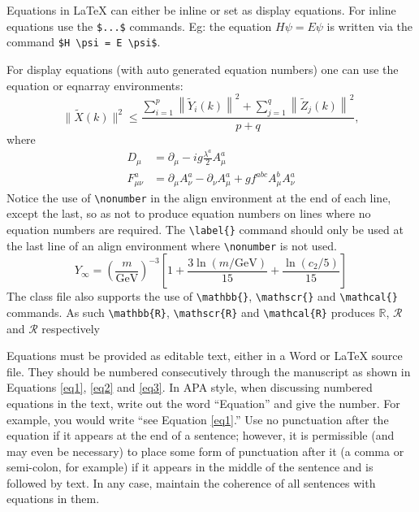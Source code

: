 \documentclass[12pt,a4paper]{article}
\begin{document}
Equations in \LaTeX{} can either be inline or set as display equations. For
inline equations use the \verb+$...$+ commands. Eg: the equation
$H\psi = E \psi$ is written via the command \verb+$H \psi = E \psi$+.

For display equations (with auto generated equation numbers)
one can use the equation or eqnarray environments:
\begin{equation}
\|\tilde{X}(k)\|^2 \leq\frac{\sum\limits_{i=1}^{p}\left\|\tilde{Y}_i(k)\right\|^2+\sum\limits_{j=1}^{q}\left\|\tilde{Z}_j(k)\right\|^2 }{p+q},
\label{eq1}
\end{equation}
where
\begin{align}
D_\mu &=  \partial_\mu - ig \frac{\lambda^a}{2} A^a_\mu \nonumber \\
F^a_{\mu\nu} &= \partial_\mu A^a_\nu - \partial_\nu A^a_\mu + g f^{abc} A^b_\mu A^a_\nu
\label{eq2}
\end{align}
Notice the use of \verb+\nonumber+ in the align environment at the end
of each line, except the last, so as not to produce equation numbers on
lines where no equation numbers are required. The \verb+\label{}+ command
should only be used at the last line of an align environment where
\verb+\nonumber+ is not used.
\begin{equation}
Y_\infty = \left( \frac{m}{\textrm{GeV}} \right)^{-3}
    \left[ 1 + \frac{3 \ln(m/\textrm{GeV})}{15}
    + \frac{\ln(c_2/5)}{15} \right]
\label{eq3}
\end{equation}
The class file also supports the use of \verb+\mathbb{}+, \verb+\mathscr{}+ and
\verb+\mathcal{}+ commands. As such \verb+\mathbb{R}+, \verb+\mathscr{R}+
and \verb+\mathcal{R}+ produces $\mathbb{R}$, $\mathscr{R}$ and $\mathcal{R}$
respectively 

Equations must be provided as editable text, either in a Word or LaTeX source file. They should be numbered consecutively through the manuscript as shown in Equations \ref{eq1}, \ref{eq2} and \ref{eq3}. In APA style, when discussing numbered equations in the text, write out the word “Equation” and give the number. For example, you would write “see Equation \ref{eq1}.”
Use no punctuation after the equation if it appears at the end of a sentence; however, it is permissible (and may even be necessary) to place some form of punctuation after it (a comma or semi-colon, for example) if it appears in the middle of the sentence and is followed by text. In any case, maintain the coherence of all sentences with equations in them.
\end{document}

